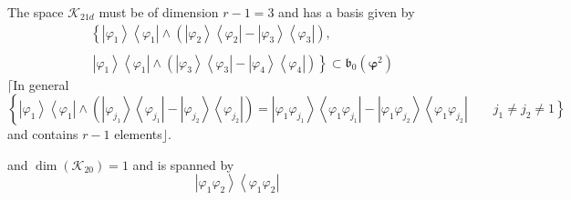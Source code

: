 \documentclass[aps,preprint]{revtex4}%
\begin{document}
The space $\mathcal{K}_{21d}$ must be of dimension $r-1=3$ and has a basis
given by
\begin{align}
&  \left\{  \left\vert \varphi_{1}\right\rangle \left\langle \varphi
_{1}\right\vert \wedge\left(  \left\vert \varphi_{2}\right\rangle \left\langle
\varphi_{2}\right\vert -\left\vert \varphi_{3}\right\rangle \left\langle
\varphi_{3}\right\vert \right)  ,\right. \nonumber\\
&  \,\,\nonumber\\
&  \left.  \,\left\vert \varphi_{1}\right\rangle \left\langle \varphi
_{1}\right\vert \wedge\left(  \left\vert \varphi_{3}\right\rangle \left\langle
\varphi_{3}\right\vert -\left\vert \varphi_{4}\right\rangle \left\langle
\varphi_{4}\right\vert \right)  \right\}  \subset\mathfrak{b}_{0}\left(
\mathbf{\varphi}^{2}\right)
\end{align}
$\mathbf{\lceil}$In general
\begin{equation}
\left\{  \left\vert \varphi_{1}\right\rangle \left\langle \varphi
_{1}\right\vert \wedge\left(  \left\vert \varphi_{j_{1}}\right\rangle
\left\langle \varphi_{j_{1}}\right\vert -\left\vert \varphi_{j_{2}%
}\right\rangle \left\langle \varphi_{j_{2}}\right\vert \right)  \right.
=\left\vert \varphi_{1}\varphi_{j_{1}}\right\rangle \left\langle \varphi
_{1}\varphi_{j_{1}}\right\vert -\left\vert \varphi_{1}\varphi_{j_{2}%
}\right\rangle \left\langle \varphi_{1}\varphi_{j_{2}}\right\vert
\qquad\left.  j_{1}\neq j_{2}\neq1\right\}
\end{equation}
and contains $r-1$ elements$\rfloor.$

and $\dim\left(  \mathcal{K}_{20}\right)  =1$ and is spanned by
\begin{equation}
\left\vert \varphi_{1}\varphi_{2}\right\rangle \left\langle \varphi_{1}%
\varphi_{2}\right\vert
\end{equation}
\end{document}
